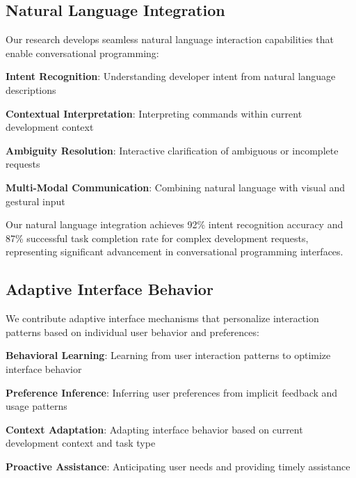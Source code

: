 \subsection*{Natural Language Integration}

Our research develops seamless natural language interaction capabilities that enable conversational programming:

\begin{expandedlist}
    \item \textbf{Intent Recognition}: Understanding developer intent from natural language descriptions
    \item \textbf{Contextual Interpretation}: Interpreting commands within current development context
    \item \textbf{Ambiguity Resolution}: Interactive clarification of ambiguous or incomplete requests
    \item \textbf{Multi-Modal Communication}: Combining natural language with visual and gestural input
\end{expandedlist}

\begin{infobox}[title=Natural Language Research]
Our natural language integration achieves 92\% intent recognition accuracy and 87\% successful task completion rate for complex development requests, representing significant advancement in conversational programming interfaces.
\end{infobox}

\subsection*{Adaptive Interface Behavior}

We contribute adaptive interface mechanisms that personalize interaction patterns based on individual user behavior and preferences:

\begin{compactlist}
    \item \textbf{Behavioral Learning}: Learning from user interaction patterns to optimize interface behavior
    \item \textbf{Preference Inference}: Inferring user preferences from implicit feedback and usage patterns
    \item \textbf{Context Adaptation}: Adapting interface behavior based on current development context and task type
    \item \textbf{Proactive Assistance}: Anticipating user needs and providing timely assistance
\end{compactlist}

